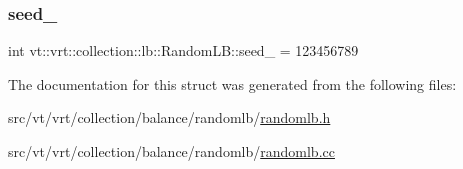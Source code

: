 \subsubsection{\texorpdfstring{seed\+\_\+}{seed\_}}
{\footnotesize\ttfamily int vt\+::vrt\+::collection\+::lb\+::\+Random\+L\+B\+::seed\+\_\+ = 123456789\hspace{0.3cm}{\ttfamily [private]}}



The documentation for this struct was generated from the following files\+:\begin{DoxyCompactItemize}
\item 
src/vt/vrt/collection/balance/randomlb/\hyperlink{randomlb_8h}{randomlb.\+h}\item 
src/vt/vrt/collection/balance/randomlb/\hyperlink{randomlb_8cc}{randomlb.\+cc}\end{DoxyCompactItemize}
